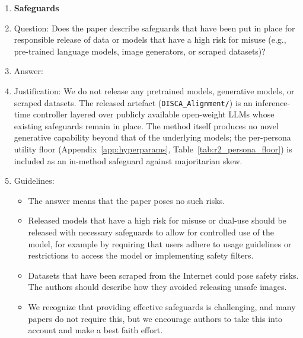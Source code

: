 \begin{enumerate}
\begin{itemize}
        \item The authors should consider possible harms that could arise when the technology is being used as intended and functioning correctly, harms that could arise when the technology is being used as intended but gives incorrect results, and harms following from (intentional or unintentional) misuse of the technology.
        \item If there are negative societal impacts, the authors could also discuss possible mitigation strategies (e.g., gated release of models, providing defenses in addition to attacks, mechanisms for monitoring misuse, mechanisms to monitor how a system learns from feedback over time, improving the efficiency and accessibility of ML).
    \end{itemize}
    
\item {\bf Safeguards}
    \item[] Question: Does the paper describe safeguards that have been put in place for responsible release of data or models that have a high risk for misuse (e.g., pre-trained language models, image generators, or scraped datasets)?
    \item[] Answer: \answerNA{}
    \item[] Justification: We do not release any pretrained models, generative models, or scraped datasets. The released artefact (\texttt{DISCA\_Alignment/}) is an inference-time controller layered over publicly available open-weight LLMs whose existing safeguards remain in place. The method itself produces no novel generative capability beyond that of the underlying models; the per-persona utility floor (Appendix~\ref{app:hyperparams}, Table~\ref{tab:r2_persona_floor}) is included as an in-method safeguard against majoritarian skew.
    \item[] Guidelines:
    \begin{itemize}
        \item The answer \answerNA{} means that the paper poses no such risks.
        \item Released models that have a high risk for misuse or dual-use should be released with necessary safeguards to allow for controlled use of the model, for example by requiring that users adhere to usage guidelines or restrictions to access the model or implementing safety filters. 
        \item Datasets that have been scraped from the Internet could pose safety risks. The authors should describe how they avoided releasing unsafe images.
        \item We recognize that providing effective safeguards is challenging, and many papers do not require this, but we encourage authors to take this into account and make a best faith effort.
    \end{itemize}


\end{enumerate}
